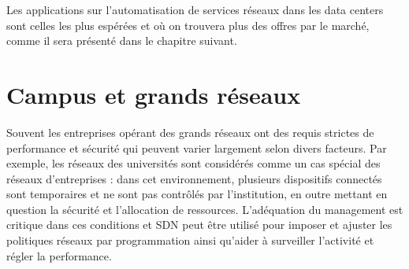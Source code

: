 
Les applications sur l'automatisation de services réseaux dans les data centers sont celles les plus espérées et où on trouvera plus des offres par le marché, comme il sera présenté dans le chapitre suivant.


\section{Campus et grands réseaux}

Souvent les entreprises opérant des grands réseaux ont des requis strictes de performance et sécurité qui peuvent varier largement selon divers facteurs. Par exemple, les réseaux des universités sont considérés comme un cas spécial des réseaux d'entreprises : dans cet environnement, plusieurs dispositifs connectés sont temporaires et ne sont pas contrôlés par l'institution, en outre mettant en question la sécurité et l'allocation de ressources. L'adéquation du management est critique dans ces conditions et SDN peut être utilisé pour imposer et ajuster les politiques réseaux par programmation ainsi qu'aider à surveiller l'activité et régler la performance.


